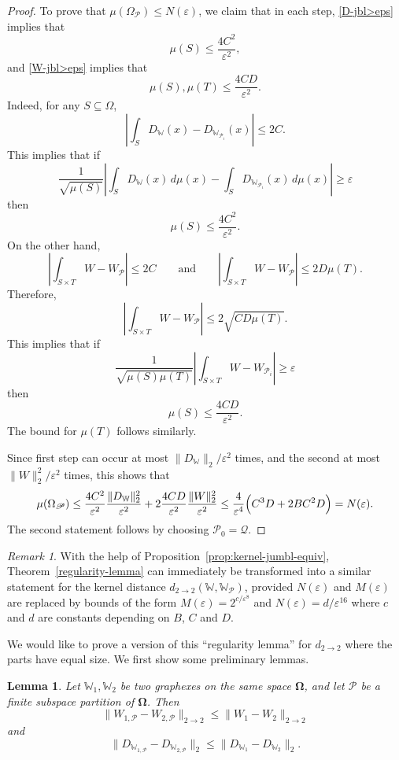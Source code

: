 \documentclass{amsart}
\numberwithin{equation}{section}
\numberwithin{figure}{section}
\newtheorem{lemma}[theorem]{Lemma}
\theoremstyle{definition}
\theoremstyle{remark}
\newtheorem{remark}[theorem]{Remark}
\newcommand{\eps}{\varepsilon}
\newcommand{\bOmega}{{\mathbf{\Omega}}}
\newcommand{\cP}{\mathcal{P}}
\newcommand{\cW}{\mathbb{W}}
\newcommand{\sP}{\mathscr{P}}
\newcommand{\sQ}{\mathscr{Q}}
\def\d22{d_{2\to 2}}
\begin{document}
\begin{proof}
To prove that $\mu(\Omega_{\sP}) \le N(\varepsilon)$, we claim that
in each step, \eqref{D-jbl>eps} implies that
\[\mu(S) \le \frac{4C^2}{\eps^2},
\]
and \eqref{W-jbl>eps} implies that
\[\mu(S),\mu(T) \le \frac{4CD}{\eps^2}
.\] Indeed, for any $S \subseteq \Omega$,
\[\left|\int_S D_\cW(x)-D_{\cW_{\cP_i}}(x) \right| \le 2C .\]
This implies that if
\[
\frac{1}{\sqrt{\mu(S)}} \left|\int_S D_\cW(x) \,d\mu(x)-\int_S D_{\cW_{\sP_i}}(x) \,d\mu(x) \right|\ge
\eps
\]
then
\[\mu(S) \le \frac{4C^2}{\eps^2}.
\]
On the other hand,
\[\left|\int_{S \times T}W-W_\sP \right| \le 2C
\qquad\text{and}\qquad
\left|\int_{S \times T}W-W_\sP \right| \le 2 D\mu(T).
\]
Therefore,
\[\left|\int_{S \times T}W-W_\sP \right| \le 2\sqrt{C D\mu(T)}.
\]
This implies that if
\[\frac{1}{\sqrt{\mu(S)\mu(T)}}\left|\int_{S \times T} W- W_{\sP_i}\right| \ge
\eps
\] then
\[\mu(S) \le \frac{4CD}{\eps^2}
.\] The bound for $\mu(T)$ follows similarly.

Since first step can occur at most ${\|D_\cW\|_2}/{\varepsilon^2}$ times, and
the second at most ${\|W\|_2^2 }/{\varepsilon^2}$ times, this shows that
\[\mu(\Omega_{\sP}) \le
\frac{4C^2}{\eps^2}\frac{\|D_\cW\|_2^2}{\varepsilon^2}+ 2\frac{4CD}{\eps^2}\frac{\|W\|_2^2 }{\varepsilon^2}
\leq\frac 4{\eps^4}\Bigl(C^3D+2BC^2D\Bigr)=N(\varepsilon).
\]
The second statement follows by choosing $\sP_0=\sQ$.
\end{proof}

\begin{remark}
With the help of Proposition~\ref{prop:kernel-jumbl-equiv},
Theorem~\ref{regularity-lemma} can immediately be transformed into a similar
statement for the kernel distance $\d22(\cW,\cW_\sP)$, provided $N(\eps)$ and
$M(\eps)$ are replaced by bounds of the form $M(\eps)=2^{c/\eps^8}$ and
$N(\eps)=d/\eps^{16}$ where $c$ and $d$ are constants depending on $B$, $C$
and $D$.
\end{remark}

We would like to prove a version of this ``regularity lemma'' for $\d22$
where the parts have equal size. We first show some preliminary lemmas.

\begin{lemma} \label{lem:partitionsmallerdistance}
Let $\cW_1,\cW_2$ be two graphexes on the same space $\bOmega$, and let $\sP$
be a finite subspace partition of $\bOmega$. Then
\[\|W_{1,\sP}-W_{2,\sP}\|_{2 \rightarrow 2} \le \|W_1-W_2\|_{2 \rightarrow 2}
\] and
\[
\|D_{\cW_{1,\sP}}-D_{\cW_{2,\sP}}\|_2
\le \|D_{\cW_1}-D_{\cW_2}\|_2
.\]
\end{lemma}
\end{document}
